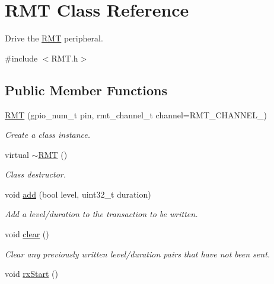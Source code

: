 \hypertarget{class_r_m_t}{}\section{R\+MT Class Reference}
\label{class_r_m_t}


Drive the \hyperlink{class_r_m_t}{R\+MT} peripheral.  




{\ttfamily \#include $<$R\+M\+T.\+h$>$}

\subsection*{Public Member Functions}
\begin{DoxyCompactItemize}
\item 
\hyperlink{class_r_m_t_ab4e0f3b8ff01d7604d0bc52bc44c590f}{R\+MT} (gpio\+\_\+num\+\_\+t pin, rmt\+\_\+channel\+\_\+t channel=R\+M\+T\+\_\+\+C\+H\+A\+N\+N\+E\+L\+\_)
\begin{DoxyCompactList}\small\item\em Create a class instance. \end{DoxyCompactList}\item 
virtual \hyperlink{class_r_m_t_a5b59083a872122d19e34d5585a06914f}{$\sim$\+R\+MT} ()\hypertarget{class_r_m_t_a5b59083a872122d19e34d5585a06914f}{}\label{class_r_m_t_a5b59083a872122d19e34d5585a06914f}

\begin{DoxyCompactList}\small\item\em Class destructor. \end{DoxyCompactList}\item 
void \hyperlink{class_r_m_t_a29461fa2ff9900b5ddff5dd0ec35abb0}{add} (bool level, uint32\+\_\+t duration)
\begin{DoxyCompactList}\small\item\em Add a level/duration to the transaction to be written. \end{DoxyCompactList}\item 
void \hyperlink{class_r_m_t_acf727f6cdf9b357a320a19661f90e6c4}{clear} ()\hypertarget{class_r_m_t_acf727f6cdf9b357a320a19661f90e6c4}{}\label{class_r_m_t_acf727f6cdf9b357a320a19661f90e6c4}

\begin{DoxyCompactList}\small\item\em Clear any previously written level/duration pairs that have not been sent. \end{DoxyCompactList}\item 
void \hyperlink{class_r_m_t_af1b130bf271e12117511f75f6e08fcea}{rx\+Start} ()\hypertarget{class_r_m_t_af1b130bf271e12117511f75f6e08fcea}{}\label{class_r_m_t_af1b130bf271e12117511f75f6e08fcea}


\end{DoxyCompactItemize}
